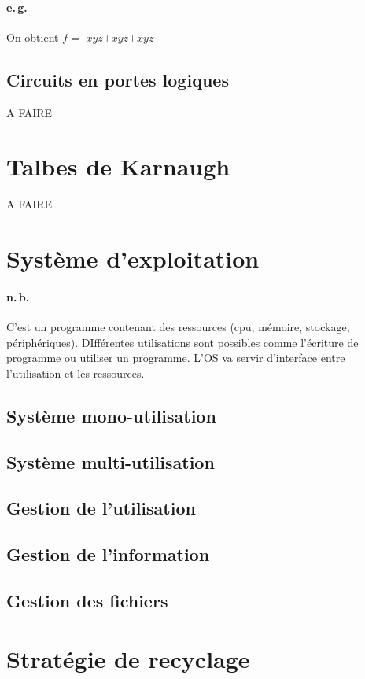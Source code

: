 \documentclass{report}
\begin{document}
    \paragraph{e.\,g.} On obtient $f =$ $\overline{x}\overline{y}\overline{z}$+$\overline{x}y\overline{z}$+$\overline{x}yz$

  \subsection{Circuits en portes logiques}

  A FAIRE

\section{Talbes de Karnaugh}

  A FAIRE

\section{Système d'exploitation}

  \paragraph{n.\,b.} C'est un programme contenant des ressources (cpu, mémoire, stockage, périphériques). DIfférentes utilisations sont possibles comme l'écriture de programme ou utiliser un programme. L'OS va servir d'interface entre l'utilisation et les ressources.

  \subsection{Système mono-utilisation}
  \subsection{Système multi-utilisation}

  \subsection{Gestion de l'utilisation}
  \subsection{Gestion de l'information}
  \subsection{Gestion des fichiers}

\section{Stratégie de recyclage}
\end{document}
